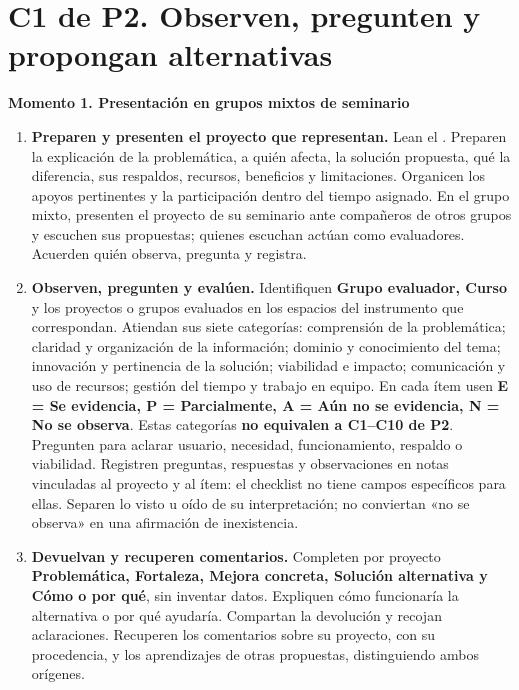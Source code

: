 \section*{C1 de P2. Observen, pregunten y propongan alternativas}
\textbf{Momento 1. Presentación en grupos mixtos de seminario}
\begin{enumerate}[series=pasos]
\item \textbf{Preparen y presenten el proyecto que representan.} Lean el . Preparen la explicación de la problemática, a quién afecta, la solución propuesta, qué la diferencia, sus respaldos, recursos, beneficios y limitaciones. Organicen los apoyos pertinentes y la participación dentro del tiempo asignado. En el grupo mixto, presenten el proyecto de su seminario ante compañeros de otros grupos y escuchen sus propuestas; quienes escuchan actúan como evaluadores. Acuerden quién observa, pregunta y registra.
\item \textbf{Observen, pregunten y evalúen.} Identifiquen \textbf{Grupo evaluador, Curso} y los proyectos o grupos evaluados en los espacios del instrumento que correspondan. Atiendan sus siete categorías: comprensión de la problemática; claridad y organización de la información; dominio y conocimiento del tema; innovación y pertinencia de la solución; viabilidad e impacto; comunicación y uso de recursos; gestión del tiempo y trabajo en equipo. En cada ítem usen \textbf{E = Se evidencia, P = Parcialmente, A = Aún no se evidencia, N = No se observa}. Estas categorías \textbf{no equivalen a C1--C10 de P2}. Pregunten para aclarar usuario, necesidad, funcionamiento, respaldo o viabilidad. Registren preguntas, respuestas y observaciones en notas vinculadas al proyecto y al ítem: el checklist no tiene campos específicos para ellas. Separen lo visto u oído de su interpretación; no conviertan «no se observa» en una afirmación de inexistencia.
\item \textbf{Devuelvan y recuperen comentarios.} Completen por proyecto \textbf{Problemática, Fortaleza, Mejora concreta, Solución alternativa y Cómo o por qué}, sin inventar datos. Expliquen cómo funcionaría la alternativa o por qué ayudaría. Compartan la devolución y recojan aclaraciones. Recuperen los comentarios sobre su proyecto, con su procedencia, y los aprendizajes de otras propuestas, distinguiendo ambos orígenes.
\end{enumerate}


